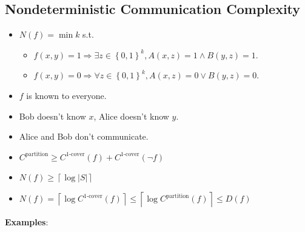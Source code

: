 \documentclass[10pt,landscape,a4paper]{article}
\newcommand{\set}[1]{\left \{ #1 \right \}}
\newcommand{\abs}[1]{\left | #1 \right |}
\newcommand{\ceil}[1]{\left \lceil #1 \right \rceil}
\begin{document}
\begin{multicols*}{3}
\subsection{Nondeterministic Communication Complexity}

\begin{itemize}
    \item $N(f) = \min k$ s.t.
    \begin{itemize}
        \item $f(x, y) = 1 \Rightarrow \exists z \in \set{0, 1}^k, A(x, z) = 1 \wedge B(y, z) = 1$.
        \item $f(x, y) = 0 \Rightarrow \forall z \in \set{0, 1}^k, A(x, z) = 0\vee B(y, z) = 0$.
    \end{itemize}
    \item $f$ is known to everyone.
    \item Bob doesn't know $x$, Alice doesn't know $y$.
    \item Alice and Bob don't communicate.
    \item $C^{\text{partition}} \geq C^{\text{1-cover}} (f) + C^{\text{1-cover}} (\neg f)$
    \item $N(f) \geq \ceil{\log{\abs{S}}}$
    \item $N(f) = \ceil{\log{C^{\text{1-cover}} (f)}} \leq \ceil{\log{C^{\text{partition}} (f)}} \leq D(f)$
\end{itemize}

\textbf{Examples}:


\end{multicols*}
\end{document}
